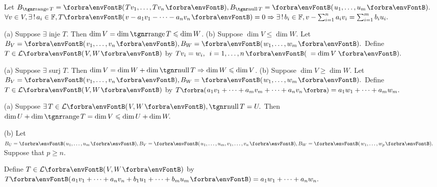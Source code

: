 Let $B_{\range T}=\Par{Tv_1,\dots,Tv_n},B_{\null T}=\Par{u_1,\dots,u_m}.$\parSol{}
$\forall v\in V,\exists\,!\,a_i\in\Fbb,T\Par{v-a_1 v_1-\dots-a_n v_n}=0\Rightarrow\exists\,!\,b_i\in\Fbb,v-\sum_{i=1}^na_iv_i=\sum_{i=1}^mb_iu_i.$\PfEnd
\SepLine

(a) Suppose $\exists$ inje $T$. Then $\dim V=\dim\range T\leqslant\dim W$.\parSol{}
(b) Suppose $\dim V\leqslant\dim W.$ Let $B_V=\Par{v_1,\dots,v_n},B_W=\Par{w_1,\dots,w_m}.$\parSol{\Hb}
Define $T\in\Lm{V,W}$ by $Tv_i=w_i,\,\,\,i=1,\dots,n\,\Par{\,=\dim V\,}.$\PfEnd
\SepLine

(a) Suppose $\exists$ surj $T$. Then $\dim V=\dim W+\dim\null T\Rightarrow\dim W\leqslant\dim V$.\parSol{}
(b) Suppose $\dim V\geqslant\dim W.$ Let $B_V=\Par{v_1,\dots,v_n},B_W=\Par{w_1,\dots,w_m}.$\parSol{\Hb}
Define $T\in\Lm{V,W}$ by $T\BigPar{a_1 v_1+\dots+a_m v_m+\dots+a_n v_n}=a_1 w_1+\dots+a_m w_m.$\PfEnd
\SepLine

\par\quad
(a) Suppose $\exists\,T\in\Lm{V,W},\null T=U.$ Then $\dim U+\dim\range T=\dim V\leqslant\dim U+\dim W.$\par\quad
(b) Let $B_U=\Par{u_1,\dots,u_m},B_V=\Par{u_1,\dots,u_m,v_1,\dots,v_n},B_W=\Par{w_1,\dots,w_p}.$ Suppose that $p\geqslant n.$\par\quad\Hb
Define $T\in\Lm{V,W}$ by $T\Par{a_1 v_1+\dots+a_n v_n+b_1 u_1+\dots+b_m u_m}=a_1 w_1+\dots+a_n w_n.$\PfEnd
\SepLine\pagebreak



